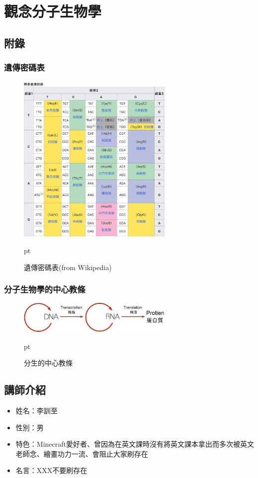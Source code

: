 \chapter{觀念分子生物學}

\section{附錄}
\subsection{遺傳密碼表}

\begin{figure}[H]
\centering
\graphicspath{{biology/}}
\includegraphics[width=7.5cm, center]{protein.jpg}
\caption{遺傳密碼表(from Wikipedia)}  pt
\label{fig:code}
\end{figure}

\subsection{分子生物學的中心教條}

\begin{figure}[H]
\centering
\graphicspath{{biology/}}
\includegraphics[width=7.5cm, center]{DNA.jpg}
\caption{分生的中心教條}  pt
\label{fig:DNA}
\end{figure}

\section{講師介紹}
\begin{itemize}
\item 姓名：李訓至
\item 性別：男
\item 特色：Minecraft愛好者、曾因為在英文課時沒有將英文課本拿出而多次被英文老師念、繪畫功力一流、會阻止大家刷存在
\item 名言：XXX不要刷存在
\end{itemize}